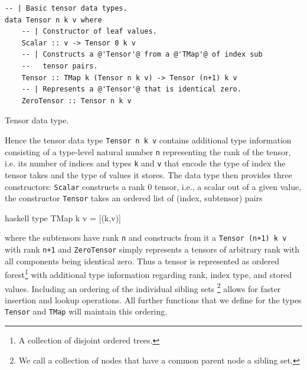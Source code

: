 \documentclass[a4paper,12pt, DIV=14, BCOR=5mm, twoside, headsepline, numbers=noenddot]{scrbook}
\begin{document}
\begin{listing}[hbt!]
\begin{verbatim}
-- | Basic tensor data types.
data Tensor n k v where
    -- | Constructor of leaf values.
    Scalar :: v -> Tensor 0 k v
    -- | Constructs a @'Tensor'@ from a @'TMap'@ of index sub
    --   tensor pairs.
    Tensor :: TMap k (Tensor n k v) -> Tensor (n+1) k v
    -- | Represents a @'Tensor'@ that is identical zero.
    ZeroTensor :: Tensor n k v
\end{verbatim} 
\caption{Tensor data type.}\label{TensorDat}
\end{listing}

Hence the tensor data type \texttt{Tensor n k v} contains additional type information consisting of a type-level natural number \texttt{n} representing the rank of the tensor, i.e. its number of indices and types \texttt{k} and \texttt{v} that encode the type of index the tensor takes and the type of values it stores. The data type then provides three constructors: \texttt{Scalar} constructs a rank 0 tensor, i.e., a scalar out of a given value, the constructor \texttt{Tensor} takes an ordered list of (index, subtensor) pairs
\begin{center}
\begin{cminted}{haskell}
type TMap k v = [(k,v)]
\end{cminted}
\end{center}
where the subtensors have rank \texttt{n} and constructs from it a \texttt{Tensor (n+1) k v} with rank \texttt{n+1} and \texttt{ZeroTensor} simply represents a tensors of arbitrary rank with all components being identical zero. Thus a tensor is represented as ordered forest\footnote{A collection of disjoint ordered trees.} with additional type information regarding rank, index type, and stored values. Including an ordering of the individual sibling sets \footnote{We call a collection of nodes that have a common parent node a sibling set.} allows for faster insertion and lookup operations. All further functions that we define for the types \texttt{Tensor} and \texttt{TMap} will maintain this ordering.
\end{document}
